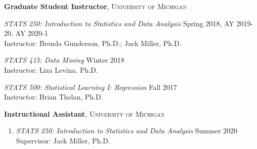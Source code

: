 \documentclass[letterpaper,11pt]{article} %
\begin{document}
		\noindent \textbf{Graduate Student Instructor}, \textsc{University of Michigan}
		\begin{etaremune}
			\item \textit{STATS 250: Introduction to Statistics and Data Analysis} \hfill Spring 2018, AY 2019-20, AY 2020-1 \\
			Instructor: Brenda Gunderson, Ph.D.; Jack Miller, Ph.D.
			
			\item \textit{STATS 415: Data Mining} \hfill Winter 2018 \\
			Instructor: Liza Levina, Ph.D. 
			
			\item \textit{STATS 500: Statistical Learning I: Regression} \hfill Fall 2017 \\
			Instructor: Brian Thelan, Ph.D.
			
		\end{etaremune}
	
	\noindent \textbf{Instructional Assistant}, \textsc{University of Michigan}
	\begin{enumerate}
		\item \textit{STATS 250: Introduction to Statistics and Data Analysis} \hfill Summer 2020 \\
		Supervisor: Jack Miller, Ph.D.
	\end{enumerate}
	
\end{document}
